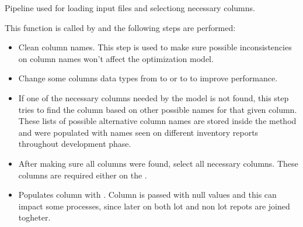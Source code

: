 \documentclass[letterpaper,10pt,english]{sphinxmanual}
\begin{document}
\begin{fulllineitems}
\label{\detokenize{source/optimization.datatools:optimization.datatools.pipelines.load_data_pipeline}}
Pipeline used for loading input files and selectiong necessary columns.

This function is called by  and the following steps are performed:
\begin{itemize}
\item {} 
  Clean column names. This step is used to make sure possible inconsistencies on column names won’t affect the optimization model.

\item {} 
  Change some columns data types from  to  or  to  to improve performance.

\item {} 
  If one of the necessary columns needed by the model is not found, this step tries to find the column based on other possible names for that given column. These lists of possible alternative column names are stored inside the method and were populated with names seen on different inventory reports throughout development phase.

\item {} 
  After making sure all columns were found, select all necessary columns. These columns are required either on the .

\item {} 
 Populates column  with . Column is passed with null values and this can impact some processes, since later on both lot and non lot repots are joined togheter.


\end{itemize}
\end{fulllineitems}
\end{document}
